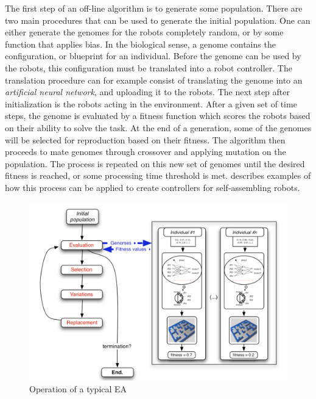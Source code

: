 The first step of an off-line algorithm is to generate some population.
There are two main procedures that can be used to generate the initial population.	 
One can either generate the genomes for the robots completely random, or by some function that applies bias.
In the biological sense, a genome contains the configuration, or blueprint for an individual.
Before the genome can be used by the robots, this configuration must be translated into a robot controller.
The translation procedure can for example consist of translating the genome into an \emph{artificial neural network}, and uploading it to the robots.
The next step after initialization is the robots acting in the environment.
After a given set of time steps, the genome is evaluated by a fitness function which scores the robots based on their ability to solve the task.	 
At the end of a generation, some of the genomes will be selected for reproduction based on their fitness.	 
The algorithm then proceeds to mate genomes through crossover and applying mutation on the population.	 
The process is repeated on this new set of genomes until the desired fitness is reached, or some processing time threshold is met.
\cite{trianni_evolving_2004}\cite{li_co-evolution_2015} describes examples of how this process can be applied to create controllers for self-assembling robots. 

\begin{figure}[H]
	
	\centering
	\includegraphics[width=\textwidth]{chapters/res/offline-ea.png}
	\caption{Operation of a typical EA\cite{doncieux_evolutionary_2011}}
	\label{fig:offline-ea}
\end{figure}

